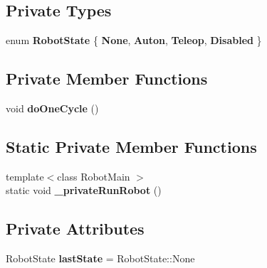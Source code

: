 \subsection*{Private Types}
\begin{DoxyCompactItemize}
\item 
\mbox{\label{classlib_iterative_robot_1_1_robot_base_a4a63ae91c048bc2f371b175527b3a461}} 
enum {\bfseries Robot\+State} \{ {\bfseries None}, 
{\bfseries Auton}, 
{\bfseries Teleop}, 
{\bfseries Disabled}
 \}
\end{DoxyCompactItemize}
\subsection*{Private Member Functions}
\begin{DoxyCompactItemize}
\item 
\mbox{\label{classlib_iterative_robot_1_1_robot_base_abb65e46433c76fe9d99facd46c1daf95}} 
void {\bfseries do\+One\+Cycle} ()
\end{DoxyCompactItemize}
\subsection*{Static Private Member Functions}
\begin{DoxyCompactItemize}
\item 
\mbox{\label{classlib_iterative_robot_1_1_robot_base_a1540d2ecd75e3a55904f78b7052bc39c}} 
{\footnotesize template$<$class Robot\+Main $>$ }\\static void {\bfseries \+\_\+private\+Run\+Robot} ()
\end{DoxyCompactItemize}
\subsection*{Private Attributes}
\begin{DoxyCompactItemize}
\item 
\mbox{\label{classlib_iterative_robot_1_1_robot_base_a3c7fd3122a6bd9772e10ca35145530d2}} 
Robot\+State {\bfseries last\+State} = Robot\+State\+::\+None
\end{DoxyCompactItemize}


